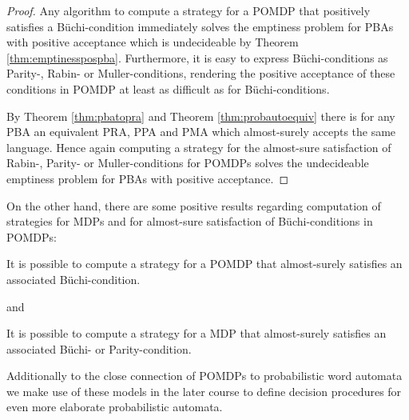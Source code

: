 \begin{proof}
  Any algorithm to compute a strategy for a \ac{POMDP} that positively 
  satisfies a Büchi-condition immediately solves the emptiness problem for
  \acp{PBA} with positive acceptance which is undecideable by Theorem 
  \ref{thm:emptinesspospba}. Furthermore, it is easy to express 
  Büchi-conditions as Parity-, Rabin- or Muller-conditions, rendering the 
  positive acceptance of these conditions in \ac{POMDP} at least as difficult
  as for Büchi-conditions. 
  
  By Theorem \ref{thm:pbatopra} and Theorem \ref{thm:probautoequiv} there is 
  for any \ac{PBA} an equivalent \ac{PRA}, \ac{PPA} and \ac{PMA} which 
  almost-surely accepts the same language. Hence again computing a strategy for 
  the almost-sure satisfaction of Rabin-, Parity- or Muller-conditions for 
  \acp{POMDP} solves the undecideable emptiness problem for \acp{PBA} with 
  positive acceptance.
\end{proof}
On the other hand, there are some positive results regarding computation of 
strategies for \acp{MDP} and for almost-sure satisfaction of Büchi-conditions
in \acp{POMDP}:
\begin{theorem}
  \cite[Theorem 5]{QualAnaPOMDP}
  It is possible to compute a strategy for a \ac{POMDP} that almost-surely 
  satisfies an associated Büchi-condition.
  \label{thm:pomdpstratsynthesis}
\end{theorem}
and
\begin{theorem}
  \cite[Theorem 4.1.7.]{QuanStochParityGames}
  It is possible to compute a strategy for a \ac{MDP} that almost-surely
  satisfies an associated Büchi- or Parity-condition.
  \label{thm:mdpstratsynthesis}
\end{theorem} 
Additionally to the close connection of \acp{POMDP} to probabilistic word 
automata we make use of these models in the later course to define decision
procedures for even more elaborate probabilistic automata.

